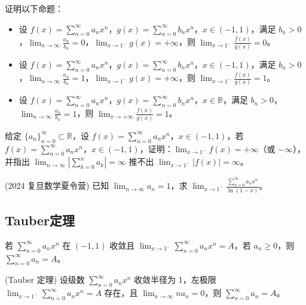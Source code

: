\documentclass[lang=cn,10pt,thmcnt=section]{elegantbook}
\begin{document}
\begin{example}
证明以下命题：
\begin{itemize}
    \item 设 $f(x) = \sum_{n=0}^{\infty} a_n x^n$，$g(x) = \sum_{n=0}^{\infty} b_n x^n$，$x \in (-1, 1)$，满足 $b_n > 0$，$\lim_{n \to \infty} \frac{a_n}{b_n} = 0$，$\lim_{x \to 1^-} g(x) = +\infty$，则 $\lim_{x \to 1^-} \frac{f(x)}{g(x)} = 0$。
    \item 设 $f(x) = \sum_{n=0}^{\infty} a_n x^n$，$g(x) = \sum_{n=0}^{\infty} b_n x^n$，$x \in (-1, 1)$，满足 $b_n > 0$，$\lim_{n \to \infty} \frac{a_n}{b_n} = 1$，$\lim_{x \to 1^-} g(x) = +\infty$，则 $\lim_{x \to 1^-} \frac{f(x)}{g(x)} = 1$。
    \item 设 $f(x) = \sum_{n=0}^{\infty} a_n x^n$，$g(x) = \sum_{n=0}^{\infty} b_n x^n$，$x \in \mathbb{R}$，满足 $b_n > 0$，$\lim_{n \to \infty} \frac{a_n}{b_n} = 1$，则 $\lim_{x \to +\infty} \frac{f(x)}{g(x)} = 1$。
\end{itemize}
\end{example}
\begin{example}
	给定 $\{a_n\}_{n=0}^{\infty} \subset \mathbb{R}$，设 $f(x) = \sum_{n=0}^{\infty} a_n x^n$，$x \in (-1, 1)$，若 $f(x) = \sum_{n=0}^{\infty} a_n x^n$，$x \in (-1, 1)$，证明：$\lim_{x \to 1^-} f(x) = +\infty$（或 $-\infty$），并指出 $\lim_{n \to \infty} \left| \sum_{k=0}^n a_k \right| = \infty$ 推不出 $\lim_{x \to 1^-} |f(x)| = \infty$。
	\end{example}
	
	\begin{example}
	(2024 复旦数学夏令营) 已知 $\lim_{n \to \infty} a_n = 1$，求 $\lim_{x \to 1^-} \frac{\sum_{n=0}^{\infty} a_n x^n}{\ln(1 - x)}$。
	\end{example}
\subsection{Tauber定理}
\begin{example}
	若 $\sum_{n=0}^{\infty} a_n x^n$ 在 $(-1, 1)$ 收敛且 $\lim_{x \to 1^-} \sum_{n=0}^{\infty} a_n x^n = A$，若 $a_n \geq 0$，则 $\sum_{n=0}^{\infty} a_n = A$。
	\end{example}
	
	\begin{example}
	(Tauber 定理) 设级数 $\sum_{n=0}^{\infty} a_n x^n$ 收敛半径为 1，左极限 $\lim_{x \to 1^-} \sum_{n=0}^{\infty} a_n x^n = A$ 存在，且 $\lim_{n \to \infty} n a_n = 0$，则 $\sum_{n=0}^{\infty} a_n = A$。
	\end{example}
\end{document}
